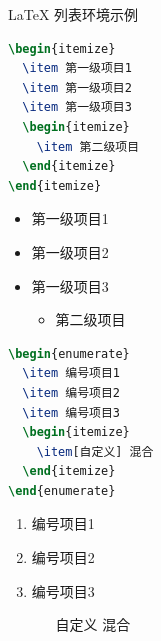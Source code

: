 \documentclass{beamer} %
\begin{document}
\begin{frame}[fragile]{\LaTeX{} 列表环境示例}
    \begin{minipage}{0.5\linewidth}
\begin{lstlisting}[language=TeX]
\begin{itemize}
  \item 第一级项目1 
  \item 第一级项目2
  \item 第一级项目3
  \begin{itemize}
    \item 第二级项目
  \end{itemize}
\end{itemize}
\end{lstlisting}
    \end{minipage}\hspace{1cm}
    \begin{minipage}{0.3\linewidth}
        \begin{itemize}
            \item 第一级项目1
            \item 第一级项目2
            \item 第一级项目3
            \begin{itemize}
                \item 第二级项目
            \end{itemize}
        \end{itemize}
    \end{minipage}
    \medskip
    \pause
    \begin{minipage}{0.5\linewidth}
\begin{lstlisting}[language=TeX]
\begin{enumerate}
  \item 编号项目1 
  \item 编号项目2
  \item 编号项目3
  \begin{itemize}
    \item[自定义] 混合
  \end{itemize}
\end{enumerate}
\end{lstlisting}
    \end{minipage}\hspace{1cm}
    \begin{minipage}{0.3\linewidth}
        \begin{enumerate}
            \item 编号项目1
            \item 编号项目2
            \item 编号项目3
            \begin{itemize}
                \item[自定义] 混合
            \end{itemize}
        \end{enumerate}
    \end{minipage}
\end{frame}
\end{document}
